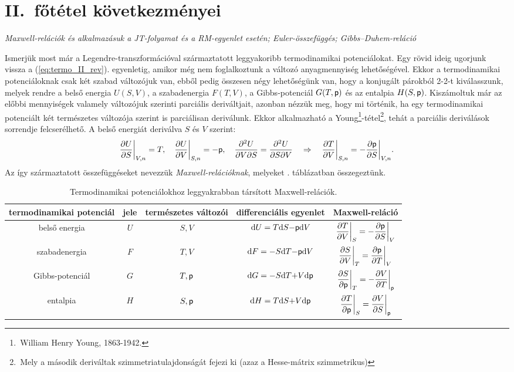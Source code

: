 \section{II.\ főtétel következményei}
\emph{Maxwell-relációk és alkalmazásuk a JT-folyamat és a RM-egyenlet esetén; Euler-összefüggés; Gibbs--Duhem-reláció}

Ismerjük most már a Legendre-transzformációval származtatott leggyakoribb termodinamikai potenciálokat. Egy rövid ideig ugorjunk vissza a (\ref{eq:termo_II_rev}). egyenletig, amikor még nem foglalkoztunk a változó anyagmennyiség lehetőségével. Ekkor a termodinamikai potenciáloknak csak két szabad változójuk van, ebből pedig összesen négy lehetőségünk van, hogy a konjugált párokból 2-2-t kiválasszunk, melyek rendre a belső energia $U(S,V)$, a szabadenergia $F(T,V)$, a Gibbs-potenciál $G(T,\mathsf p)$ és az entalpia $H(S,\mathsf p)$. Kiszámoltuk már az előbbi mennyiségek valamely változójuk szerinti parciális deriváltjait, azonban nézzük meg, hogy mi történik, ha egy termodinamikai potenciált két természetes változója szerint is parciálisan deriválunk. Ekkor alkalmazható a Young\footnote{\,William Henry Young, 1863-1942.}-tétel\footnote{\,Mely a második deriváltak szimmetriatulajdonságát fejezi ki (azaz a Hesse\footnotemark-mátrix szimmetrikus)}, tehát a parciális deriválások sorrendje felcserélhető.
A belső energiát deriválva $S$ és $V$ szerint:
\begin{align}
	\frac{\partial{U}}{\partial{S}}\bigg|_{V,n} = T,\quad \frac{\partial{U}}{\partial{V}}\bigg|_{S,n} = -\mathsf p ,\quad \frac{\partial^2 U}{\partial V\partial S} = \frac{\partial^2 U}{\partial S\partial V} \quad\Rightarrow\quad \frac{\partial{T}}{\partial{V}}\bigg|_{S,n} = - \frac{\partial{\mathsf p}}{\partial{S}}\bigg|_{V,n}.
\end{align}
Az így származtatott összefüggéseket nevezzük \emph{Maxwell-relációknak}, melyeket . táblázatban összegeztünk. 
\begin{table}[h!]
\centering
\begin{adjustbox}{width=1.1\textwidth, center=\textwidth}
\begin{tabular}{|c|c|c|c|c|} \hline
termodinamikai potenciál & jele & természetes változói & differenciális egyenlet & Maxwell-reláció\\ \hline\hline
belső energia & $U$ & $S,V$ & $\mathrm{d}U = T\mathrm{d}S{-}\mathsf p \mathrm{d}V$ & $\dfrac{\partial T}{\partial V}\bigg|_S = -\dfrac{\partial \mathsf p}{\partial S}\bigg|_V$\\ \hline
szabadenergia & $F$ & $T,V$ & $\mathrm{d}F = {-}S\mathrm{d}T{-}\mathsf p\mathrm{d}V$ & $\dfrac{\partial S}{\partial V}\bigg|_T = \dfrac{\partial \mathsf p}{\partial T}\bigg|_V$\\ \hline
Gibbs-potenciál & $G$ & $T,\mathsf p$ & $\mathrm{d}G = {-}S\mathrm{d}T {+}V\mathrm{d}\mathsf p$ & $\dfrac{\partial S}{\partial \mathsf p}\bigg|_T = -\dfrac{\partial V}{\partial T}\bigg|_\mathsf p$\\ \hline
entalpia & $H$ & $S,\mathsf p$ & $\mathrm{d}H = T\mathrm{d}S {+} V\mathrm{d}\mathsf p$ & $\dfrac{\partial T}{\partial \mathsf p}\bigg|_S = \dfrac{\partial V}{\partial S}\bigg|_\mathsf p$\\ \hline
\end{tabular}
\end{adjustbox}
\caption{Termodinamikai potenciálokhoz leggyakrabban társított Maxwell-relációk.}
\label{tab:pot_Maxwell}
\end{table}
